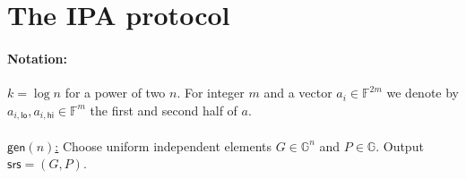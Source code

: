 \documentclass[11pt]{article} %
\newcommand{\G}{\ensuremath{{\mathbb G}}\xspace}
\newcommand{\F}{\ensuremath{\mathbb F}\xspace}
\newcommand{\srs}{\ensuremath{\mathsf{srs}}\xspace}
\newcommand{\defeq}{:=}
\newcommand{\gen}{\ensuremath{\mathsf{gen}}\xspace}
\newcommand{\fn}{\ensuremath{\F^n}\xspace}
\newcommand{\gn}{\ensuremath{\G^n}\xspace}
\newcommand{\fnn}{\ensuremath{\F^{n+1}}\xspace}
\begin{document}
\newcommand{\disc}[1]{\ensuremath{\mathsf{disc}(#1)}\xspace}
\newcommand{\alo}{\ensuremath{a_{i,\mathsf{lo}}}\xspace}
\newcommand{\anext}{\ensuremath{a_{i+1}}\xspace}
\newcommand{\bnext}{\ensuremath{b_{i+1}}\xspace}
\newcommand{\gnext}{\ensuremath{G_{i+1}}\xspace}
\newcommand{\cnext}{\ensuremath{C_{i+1}}\xspace}
\newcommand{\ahi}{\ensuremath{a_{i,\mathsf{hi}}}\xspace}
\newcommand{\glo}{\ensuremath{G_{i,\mathsf{lo}}}\xspace}
\newcommand{\ghi}{\ensuremath{G_{i,\mathsf{hi}}}\xspace}
\newcommand{\blo}{\ensuremath{b_{i,\mathsf{lo}}}\xspace}
\newcommand{\bhi}{\ensuremath{b_{i,\mathsf{hi}}}\xspace}
\newcommand{\sumk}[1]{\ensuremath{\sum_{i=1}^k #1}\xspace}
\newcommand{\expr}{\sum_{i=1}^m \gamma_i C_i}
\newcommand{\todo}[1]{TODO:#1}
\section{The IPA protocol}
\paragraph{Notation:}
$k=\log n$ for a power of two $n$. For integer $m$ and a vector $a_i\in \F^{2m}$ we denote by $\alo,\ahi\in \F^m$ the first and second half of $a$.  \\ \\

\noindent
\underline{$\gen(n)$:}
Choose uniform independent elements $G\in \gn$ and $P\in \G$.
Output $\srs=(G,P)$.\\
\end{document}
